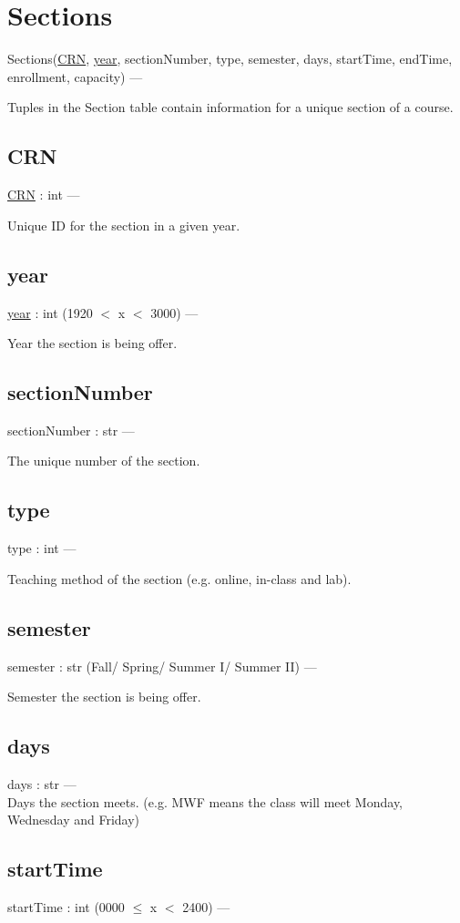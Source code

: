 \documentclass[10pt]{article}
\newcommand{\tab}{\hspace*{2em}}
\begin{document}
	
\section{Sections}
	Sections(\underline{CRN}, \underline{year}, sectionNumber, type, semester, days, startTime, endTime, enrollment, capacity) --- 
	
	Tuples in the Section table contain information for a unique section of a course.

	\subsection{CRN}
	\underline{CRN} : int --- 
	
	Unique ID for the section in a given year.
	
	\subsection{year}
	\underline{year} : int (1920 $<$ x $<$ 3000) ---
	
	Year the section is being offer.
	
	\subsection{sectionNumber}
	sectionNumber : str ---
	
	The unique number of the section.
	
	\subsection{type}
	type : int ---
	
	Teaching method of the section (e.g. online, in-class and lab).   
	
	\subsection{semester}
	semester : str (Fall/ Spring/ Summer I/ Summer II) ---
	
	Semester the section is being offer.
	
	\subsection{days}
	days : str --- \\ 
		\tab Days the section meets. (e.g. MWF means the class will meet Monday, Wednesday and Friday)
	
	\subsection{startTime}
	startTime : int (0000 $\leq$ x $<$ 2400) ---
	
\end{document}
